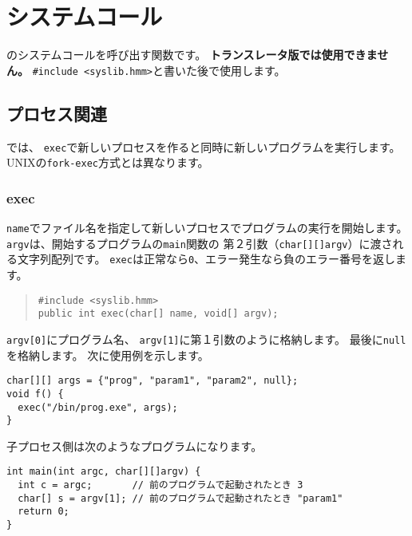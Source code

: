 % 
%
\chapter{システムコール}

\tacos のシステムコールを呼び出す関数です。
{\bf トランスレータ版では使用できません。}
\verb/#include <syslib.hmm>/と書いた後で使用します。

\section{プロセス関連}

\tacos では、
\verb/exec/で新しいプロセスを作ると同時に新しいプログラムを実行します。
UNIXの\verb/fork-exec/方式とは異なります。


\subsection{exec}

\verb/name/でファイル名を指定して新しいプロセスでプログラムの実行を開始します。
\verb/argv/は、開始するプログラムの\verb/main/関数の
第２引数（\verb/char[][]argv/）に渡される文字列配列です。
\verb/exec/は正常なら\verb/0/、エラー発生なら負のエラー番号を返します。

\begin{quote}
\begin{verbatim}
#include <syslib.hmm>
public int exec(char[] name, void[] argv);
\end{verbatim}
\end{quote}

\verb/argv[0]/にプログラム名、
\verb/argv[1]/に第１引数のように格納します。
最後に\verb/null/を格納します。
次に使用例を示します。

\begin{mylist}
\begin{verbatim}
char[][] args = {"prog", "param1", "param2", null};
void f() {
  exec("/bin/prog.exe", args);
}
\end{verbatim}
\end{mylist}

子プロセス側は次のようなプログラムになります。

\begin{mylist}
\begin{verbatim}
int main(int argc, char[][]argv) {
  int c = argc;       // 前のプログラムで起動されたとき 3
  char[] s = argv[1]; // 前のプログラムで起動されたとき "param1"
  return 0;
}
\end{verbatim}
\end{mylist}


